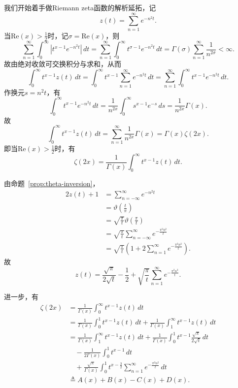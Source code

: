 \documentclass[UTF8,zihao=5,linespread=1.34]{ctexart}
\theoremstyle{cnplain}
\theoremstyle{cnremark}
\begin{document}
我们开始着手做Riemann zeta函数的解析延拓，记
\[
z(t)=\sum_{n=1}^{\infty}e^{-n^{2}t}.
\]
当$\mathrm{Re}(x)>\frac{1}{2}$时，记$\sigma=\mathrm{Re}(x)$，则
\[
\sum_{n=1}^{\infty}\int_{0}^{\infty}
\left|t^{x-1}e^{-n^{2}t}\right|\,dt
=
\sum_{n=1}^{\infty}\int_{0}^{\infty}
t^{\sigma-1}e^{-n^{2}t}\,dt
=
\Gamma(\sigma)\sum_{n=1}^{\infty}\frac{1}{n^{2\sigma}}
<\infty.
\]
故由绝对收敛可交换积分与求和，从而
\[
\int_{0}^{\infty}t^{x-1}z(t)\,dt
=
\int_{0}^{\infty}t^{x-1}
\sum_{n=1}^{\infty}e^{-n^{2}t}\,dt
=
\sum_{n=1}^{\infty}\int_{0}^{\infty}
t^{x-1}e^{-n^{2}t}\,dt.
\]
作换元$s=n^{2}t$，有
\[
\int_{0}^{\infty}t^{x-1}e^{-n^{2}t}\,dt
=
\frac{1}{n^{2x}}\int_{0}^{\infty}s^{x-1}e^{-s}\,ds
=
\frac{1}{n^{2x}}\Gamma(x).
\]
故
\[
\int_{0}^{\infty}t^{x-1}z(t)\,dt
=
\sum_{n=1}^{\infty}\frac{1}{n^{2x}}\Gamma(x)
=
\Gamma(x)\zeta(2x).
\]
即当$\mathrm{Re}(x)>\frac{1}{2}$时，有
\[
\zeta(2x)
=
\frac{1}{\Gamma(x)}
\int_{0}^{\infty}t^{x-1}z(t)\,dt.
\]

由命题~\ref{prop:theta-inversion}，
\begin{align*}
2z(t)+1
&=\sum_{n=-\infty}^{\infty}e^{-n^{2}t} \\
&=\vartheta\left(\frac{t}{\pi}\right) \\
&=\sqrt{\frac{\pi}{t}}
 \vartheta\left(\frac{\pi}{t}\right)\\
&=\sqrt{\frac{\pi}{t}}
  \sum_{n=-\infty}^{\infty}e^{-\frac{\pi^{2}n^{2}}{t}}\\
&=\sqrt{\frac{\pi}{t}}
  \left(1+2\sum_{n=1}^{\infty}
  e^{-\frac{\pi^{2}n^{2}}{t}}\right).
\end{align*}
故
\[
z(t)
=
\frac{\sqrt{\pi}}{2\sqrt{t}}
-\frac{1}{2}
+\sqrt{\frac{\pi}{t}}
 \sum_{n=1}^{\infty}e^{-\frac{\pi^{2}n^{2}}{t}}.
\]

进一步，有
\begin{align*}
\zeta(2x)
&=\frac{1}{\Gamma(x)}
  \int_{0}^{\infty}t^{x-1}z(t)\,dt\\
&=\frac{1}{\Gamma(x)}
  \int_{0}^{1}t^{x-1}z(t)\,dt
 +\frac{1}{\Gamma(x)}
  \int_{1}^{\infty}t^{x-1}z(t)\,dt\\
&=\frac{1}{\Gamma(x)}
  \int_{1}^{\infty}t^{x-1}z(t)\,dt
 +\frac{1}{\Gamma(x)}
  \int_{0}^{1}t^{x-1}
  \frac{\sqrt{\pi}}{2\sqrt{t}}\,dt\\
&\quad
 -\frac{1}{2\Gamma(x)}
  \int_{0}^{1}t^{x-1}\,dt\\
&\quad
 +\frac{\sqrt{\pi}}{\Gamma(x)}
  \int_{0}^{1}t^{x-\frac{3}{2}}
  \sum_{n=1}^{\infty}
  e^{-\frac{\pi^{2}n^{2}}{t}}\,dt\\
&\triangleq A(x)+B(x)-C(x)+D(x).
\end{align*}
\end{document}
